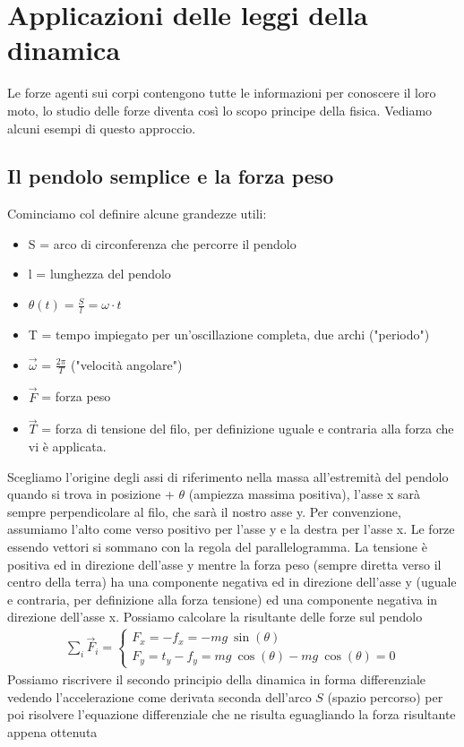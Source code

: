 \documentclass[10pt,a4paper]{article}
\begin{document}
\section{Applicazioni delle leggi della dinamica}
Le forze agenti sui corpi contengono tutte le informazioni per conoscere il loro moto, lo studio delle forze diventa così lo scopo principe della fisica. Vediamo alcuni esempi di questo approccio.
\subsection{Il pendolo semplice e la forza peso} \label{sec:pendulum}
Cominciamo col definire alcune grandezze utili:
\begin{itemize}
\item S = arco di circonferenza che percorre il pendolo
\item l = lunghezza del pendolo
\item $\theta(t) = \frac{S}{l} = \omega \cdot t$
\item T = tempo impiegato per un'oscillazione completa, due archi ("periodo")
\item $\vec{\omega}$ = $\frac{2 \pi}{T}$ ("velocità angolare")
\item $\vec{F}$ = forza peso
\item $\vec{T}$ = forza di tensione del filo, per definizione uguale e contraria alla forza che vi è applicata.
\end{itemize}
Scegliamo l'origine degli assi di riferimento nella massa all'estremità del pendolo quando si trova in posizione + $\theta$ (ampiezza massima positiva), l'asse x sarà sempre perpendicolare al filo, che sarà il nostro asse y. Per convenzione, assumiamo l'alto come verso positivo per l'asse y e la destra per l'asse x. Le forze essendo vettori si sommano con la regola del parallelogramma. La tensione è positiva ed in direzione dell'asse y mentre la forza peso (sempre diretta verso il centro della terra) ha una componente negativa ed in direzione dell'asse y (uguale e contraria, per definizione alla forza tensione) ed una componente negativa in direzione dell'asse x. Possiamo calcolare la risultante delle forze sul pendolo
\begin{align*}
	\sum_{i} \vec{F}_i = 
	\begin{cases}
		F_x = -f_x = - mg\ \sin(\theta)\\
		F_y = t_y -f_y = mg\ \cos(\theta) - mg\ \cos(\theta) = 0
	\end{cases}
\end{align*}
Possiamo riscrivere il secondo principio della dinamica in forma differenziale vedendo l'accelerazione come derivata seconda dell'arco $S$ (spazio percorso) per poi risolvere l'equazione differenziale che ne risulta eguagliando la forza risultante appena ottenuta
\end{document}
